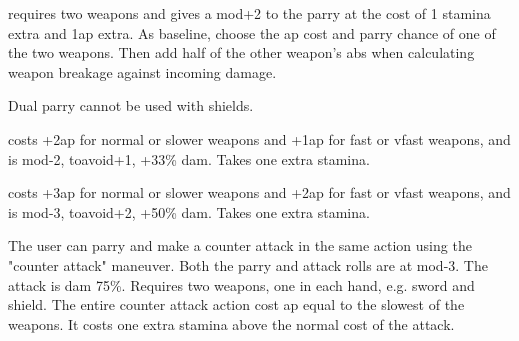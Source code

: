 

 requires two weapons and gives a mod+2 to the parry at the cost of 1 stamina extra and 1ap extra. As baseline, choose the ap cost and parry chance of one of the two weapons. Then add half of the other weapon's abs when calculating weapon breakage against incoming damage.

\noindent Dual parry cannot be used with shields.


 costs +2ap for normal or slower weapons and +1ap for fast or vfast weapons, and is mod-2, toavoid+1, +33\% dam. Takes one extra stamina.


 costs +3ap for normal or slower weapons and +2ap for fast or vfast weapons, and is mod-3, toavoid+2, +50\% dam. Takes one extra stamina.


%
%


 The user can parry and make a counter attack in the same action using the "counter attack" maneuver. Both the parry and attack rolls are at mod-3. The attack is dam 75\%.
Requires two weapons, one in each hand, e.g. sword and shield. The entire counter attack action cost ap equal to the slowest of the weapons. It costs one extra stamina above the normal cost of the attack.


